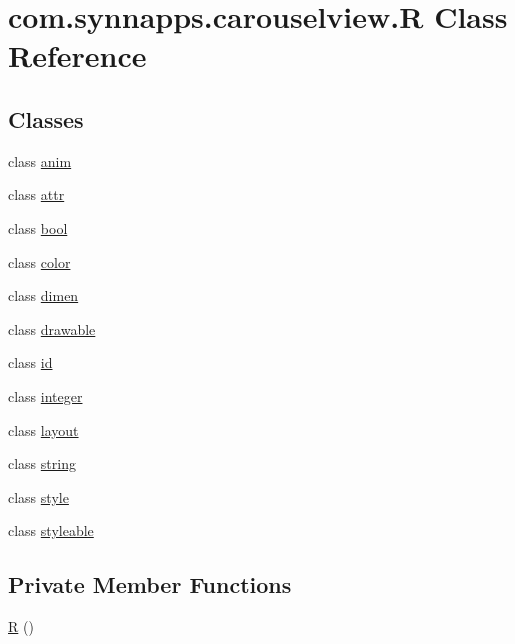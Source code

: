 \hypertarget{classcom_1_1synnapps_1_1carouselview_1_1_r}{}\section{com.\+synnapps.\+carouselview.\+R Class Reference}
\label{classcom_1_1synnapps_1_1carouselview_1_1_r}
\subsection*{Classes}
\begin{DoxyCompactItemize}
\item 
class \mbox{\hyperlink{classcom_1_1synnapps_1_1carouselview_1_1_r_1_1anim}{anim}}
\item 
class \mbox{\hyperlink{classcom_1_1synnapps_1_1carouselview_1_1_r_1_1attr}{attr}}
\item 
class \mbox{\hyperlink{classcom_1_1synnapps_1_1carouselview_1_1_r_1_1bool}{bool}}
\item 
class \mbox{\hyperlink{classcom_1_1synnapps_1_1carouselview_1_1_r_1_1color}{color}}
\item 
class \mbox{\hyperlink{classcom_1_1synnapps_1_1carouselview_1_1_r_1_1dimen}{dimen}}
\item 
class \mbox{\hyperlink{classcom_1_1synnapps_1_1carouselview_1_1_r_1_1drawable}{drawable}}
\item 
class \mbox{\hyperlink{classcom_1_1synnapps_1_1carouselview_1_1_r_1_1id}{id}}
\item 
class \mbox{\hyperlink{classcom_1_1synnapps_1_1carouselview_1_1_r_1_1integer}{integer}}
\item 
class \mbox{\hyperlink{classcom_1_1synnapps_1_1carouselview_1_1_r_1_1layout}{layout}}
\item 
class \mbox{\hyperlink{classcom_1_1synnapps_1_1carouselview_1_1_r_1_1string}{string}}
\item 
class \mbox{\hyperlink{classcom_1_1synnapps_1_1carouselview_1_1_r_1_1style}{style}}
\item 
class \mbox{\hyperlink{classcom_1_1synnapps_1_1carouselview_1_1_r_1_1styleable}{styleable}}
\end{DoxyCompactItemize}
\subsection*{Private Member Functions}
\begin{DoxyCompactItemize}
\item 
\mbox{\hyperlink{classcom_1_1synnapps_1_1carouselview_1_1_r_a5e75877ef0f4ca77bd243cb74dcfee95}{R}} ()
\end{DoxyCompactItemize}


